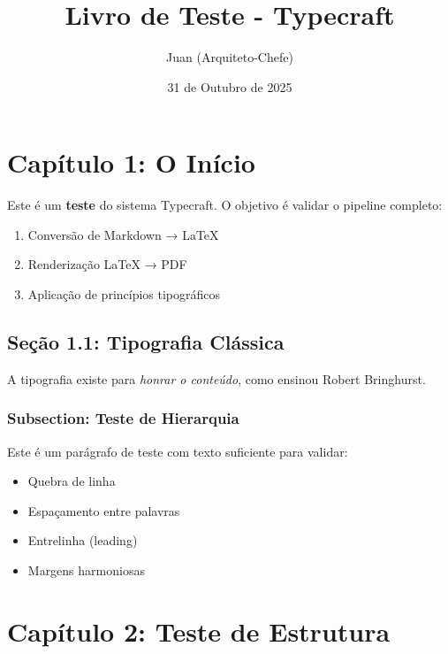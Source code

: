 \documentclass[
]{book}
\title{Livro de Teste - Typecraft}
\author{Juan (Arquiteto-Chefe)}
\date{31 de Outubro de 2025}
\providecommand{\tightlist}{%
  \setlength{\itemsep}{0pt}\setlength{\parskip}{0pt}}
\begin{document}
\frontmatter
\maketitle

\mainmatter
\hypertarget{capuxedtulo-1-o-inuxedcio}{%
\chapter{Capítulo 1: O Início}\label{capuxedtulo-1-o-inuxedcio}}

Este é um \textbf{teste} do sistema Typecraft. O objetivo é validar o
pipeline completo:

\begin{enumerate}
\def\labelenumi{\arabic{enumi}.}
\tightlist
\item
  Conversão de Markdown → LaTeX
\item
  Renderização LaTeX → PDF
\item
  Aplicação de princípios tipográficos
\end{enumerate}

\hypertarget{seuxe7uxe3o-1.1-tipografia-cluxe1ssica}{%
\section{Seção 1.1: Tipografia
Clássica}\label{seuxe7uxe3o-1.1-tipografia-cluxe1ssica}}

A tipografia existe para \emph{honrar o conteúdo}, como ensinou Robert
Bringhurst.

\hypertarget{subsection-teste-de-hierarquia}{%
\subsection{Subsection: Teste de
Hierarquia}\label{subsection-teste-de-hierarquia}}

Este é um parágrafo de teste com texto suficiente para validar:

\begin{itemize}
\tightlist
\item
  Quebra de linha
\item
  Espaçamento entre palavras
\item
  Entrelinha (leading)
\item
  Margens harmoniosas
\end{itemize}

\hypertarget{capuxedtulo-2-teste-de-estrutura}{%
\chapter{Capítulo 2: Teste de
Estrutura}\label{capuxedtulo-2-teste-de-estrutura}}
\end{document}
